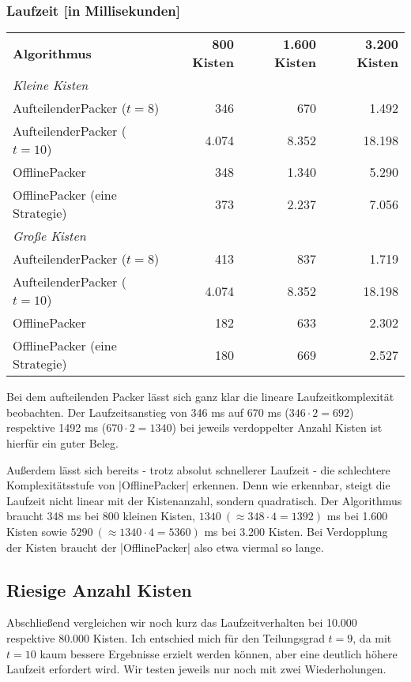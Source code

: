 \subsubsection*{Laufzeit [in Millisekunden]}
\begin{center}
\begin{tabular}{lrrr}
\vspace*{.42em}
\textbf{Algorithmus} 	& \textbf{800 Kisten} 	& \textbf{1.600 Kisten} & \textbf{3.200 Kisten} \\
\textit{Kleine Kisten} & & & \\
 AufteilenderPacker ($t=8$)	& 346		& 670			& 1.492			\\
 AufteilenderPacker ($t=10$)  	& 4.074		& 8.352			& 18.198			\\
 OfflinePacker			& 348		& 1.340			& 5.290			\\
 OfflinePacker (eine Strategie)	& 373		& 2.237			& 7.056			\\
\vspace*{.42em}
\textit{Große Kisten} & & & \\
 AufteilenderPacker ($t=8$)  	& 413		& 837			& 1.719			\\
 AufteilenderPacker ($t=10$)  	& 4.074		& 8.352			& 18.198			\\
 OfflinePacker			& 182		& 633			& 2.302			\\
 OfflinePacker (eine Strategie)	& 180		& 669			& 2.527			\\
\end{tabular}
\end{center}
 Bei dem aufteilenden Packer lässt sich ganz klar die lineare Laufzeitkomplexität beobachten.
 Der Laufzeitsanstieg von 346 ms auf 670 ms ($346 \cdot 2 = 692$) respektive 1492 ms ($670 \cdot 2 = 1340$) bei jeweils verdoppelter Anzahl Kisten ist hierfür ein guter Beleg.

 Außerdem lässt sich bereits - trotz absolut schnellerer Laufzeit - die schlechtere Komplexitätsstufe von |OfflinePacker| erkennen.
 Denn wie erkennbar, steigt die Laufzeit nicht linear mit der Kistenanzahl, sondern quadratisch.
 Der Algorithmus braucht 348 ms bei 800 kleinen Kisten, $1340\ (\approx 348 \cdot 4 = 1392)$ ms bei 1.600 Kisten sowie $5290\ (\approx 1340 \cdot 4 = 5360)$ ms bei 3.200 Kisten.
 Bei Verdopplung der Kisten braucht der |OfflinePacker| also etwa viermal so lange.

\subsection{Riesige Anzahl Kisten}
 Abschließend vergleichen wir noch kurz das Laufzeitverhalten bei 10.000 respektive 80.000 Kisten.
 Ich entschied mich für den Teilungsgrad $t=9$, da mit $t=10$ kaum bessere Ergebnisse erzielt werden können, aber eine deutlich höhere Laufzeit erfordert wird.
 Wir testen jeweils nur noch mit zwei Wiederholungen.

